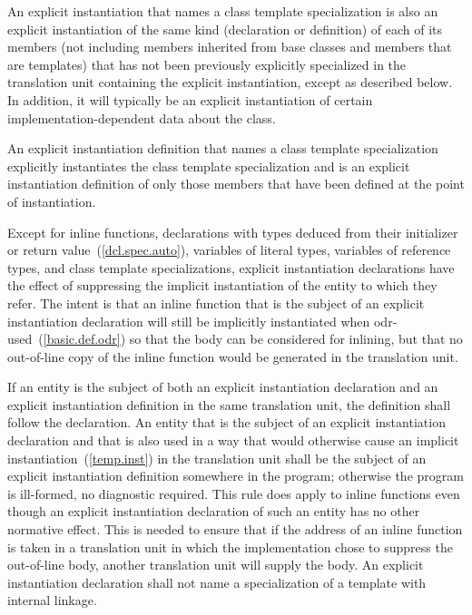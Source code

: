 \pnum
An explicit instantiation that names a class
template specialization is also an explicit
instantiation of the same kind (declaration or definition) of each
of its members (not including members inherited from base classes and members
that are templates) that has not been previously explicitly specialized in
the translation unit containing the explicit instantiation,
except as described below.
\enternote In addition, it will typically be an explicit instantiation of certain
implementation-dependent data about the class. \exitnote

\pnum
An explicit instantiation definition that names a class template
specialization explicitly instantiates the class template specialization
and is an explicit instantiation definition of only those
members that have been defined at the point of instantiation.

\pnum
Except for inline functions, declarations with types deduced from their
initializer or return value~(\ref{dcl.spec.auto}),  variables of
literal types,
variables of reference types, and class template specializations,
explicit instantiation declarations have the
effect of suppressing the implicit instantiation of the entity to which they
refer. \enternote The intent is that an inline function that is the
subject of an explicit instantiation declaration will still be implicitly
instantiated when odr-used~(\ref{basic.def.odr}) so that the body can be considered for inlining, but
that no out-of-line copy of the inline function would be generated in the
translation unit.\exitnote

\pnum
If an entity is the subject of both an explicit instantiation declaration
and an explicit instantiation definition in the same translation unit, the
definition shall follow the declaration. An entity that is the subject of an
explicit instantiation declaration and that is also used
in a way that would otherwise cause an implicit instantiation~(\ref{temp.inst})
in the translation unit
shall be the subject of an explicit instantiation definition somewhere in the
program; otherwise the program is ill-formed, no diagnostic required.
\enternote This rule does apply to inline functions even though an
explicit instantiation declaration of such an entity has no other normative
effect. This is needed to ensure that if the address of an inline function is
taken in a translation unit in which the implementation chose to suppress the
out-of-line body, another translation unit will supply the body.\exitnote
An explicit instantiation declaration shall not name a specialization of a
template with internal linkage.



